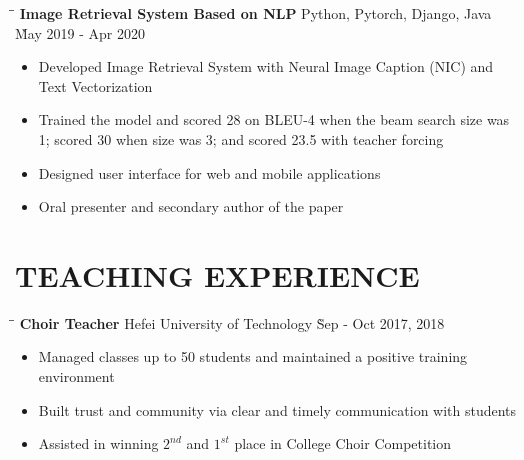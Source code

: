 \documentclass{res}
\begin{document}
\begin{resume}
    \vspace{-0.2in}	
    \begin{tabbing}
    \hspace{3in}\= \hspace{2in}\= \kill %
    {\bf Image Retrieval System Based on NLP} \> Python, Pytorch, Django, Java \` May 2019 - Apr 2020 \\
    \end{tabbing}\vspace{-20pt}      %
    \begin{itemize} \itemsep -2pt %
    \item Developed Image Retrieval System with Neural Image Caption (NIC) and Text Vectorization
    \item Trained the model and scored 28 on BLEU-4 when the beam search size was 1; scored 30 when size was 3; and scored 23.5 with teacher forcing
    \item Designed user interface for web and mobile applications 
    \item Oral presenter and secondary author of the paper
    \end{itemize}

\vspace{-0.12in}
\section{TEACHING EXPERIENCE}
    \vspace{-0.1in}	
    \begin{tabbing}
    \hspace{2.3in}\= \hspace{2.6in}\= \kill %
    {\bf Choir Teacher} \> Hefei University of Technology     \` Sep - Oct 2017, 2018\\
    \end{tabbing}\vspace{-20pt}      %
    \begin{itemize} \itemsep -2pt %
    \item Managed classes up to 50 students and maintained a positive training environment  
    \item Built trust and community via clear and timely communication with students  
    \item Assisted in winning $2^{nd}$ and $1^{st}$ place in College Choir Competition
    \end{itemize}


\end{resume}
\end{document}
